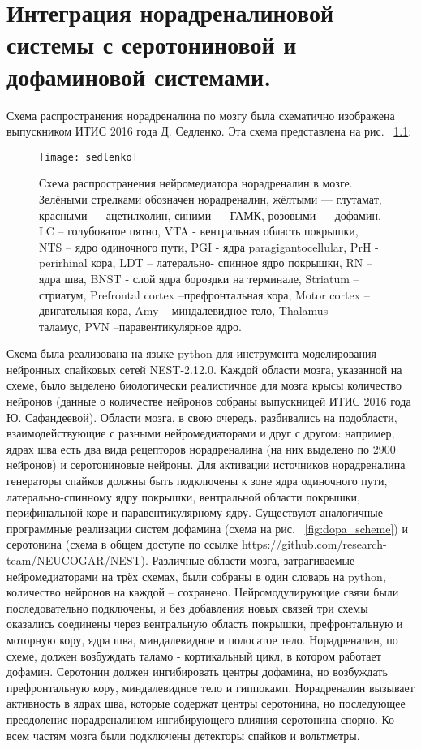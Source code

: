 \chapter{Интеграция норадреналиновой системы с серотониновой и дофаминовой системами.}
\label{chap:implementation}
Схема распространения норадреналина по мозгу была схематично изображена выпускником ИТИС 2016 года Д. Седленко. Эта схема представлена на рис. ~\ref{fig:nora_scheme}:


\begin{figure}
	\centering
	\texttt{[image: sedlenko]}
	\caption{Схема распространения нейромедиатора норадреналин в мозге. Зелёными стрелками обозначен норадреналин, жёлтыми — глутамат, красными — ацетилхолин, синими — ГАМК, розовыми — дофамин. LC – голубоватое пятно, VTA - вентральная область покрышки, NTS – ядро одиночного пути, PGI - ядра paragigantocellular, PrH - perirhinal кора, LDT – латерально- спинное ядро покрышки, RN – ядра шва, BNST - слой ядра бороздки на терминале, Striatum – стриатум, Prefrontal cortex –префронтальная кора, Motor cortex –двигательная кора, Amy – миндалевидное тело, Thalamus – таламус, PVN –паравентикулярное ядро.}
	\label{fig:nora_scheme}
\end{figure}

Схема была реализована на языке python для инструмента моделирования нейронных спайковых сетей NEST-2.12.0. Каждой области мозга, указанной на схеме, было выделено биологически реалистичное для мозга крысы количество нейронов (данные о количестве нейронов собраны выпускницей ИТИС 2016 года Ю. Сафандеевой). Области мозга, в свою очередь, разбивались на подобласти, взаимодействующие с разными нейромедиаторами и друг с другом: например, ядрах шва есть два вида рецепторов норадреналина (на них выделено по 2900 нейронов) и серотониновые нейроны. Для активации источников норадреналина генераторы спайков должны быть подключены к зоне ядра одиночного пути, латерально-спинному ядру покрышки, вентральной области покрышки, перифинальной коре и паравентикулярному ядру.
Существуют аналогичные программные реализации систем дофамина (схема на рис. ~\ref{fig:dopa_scheme}) и серотонина (схема в общем доступе по ссылке https://github.com/research-team/NEUCOGAR/NEST). Различные области мозга, затрагиваемые нейромедиаторами на трёх схемах, были собраны в один словарь на python, количество нейронов на каждой – сохранено. Нейромодулирующие связи были последовательно подключены, и без добавления новых связей три схемы оказались соединены через вентральную область покрышки, префронтальную и моторную кору, ядра шва, миндалевидное и полосатое тело. Норадреналин, по схеме, должен возбуждать таламо - кортикальный цикл, в котором работает дофамин. Серотонин должен ингибировать центры дофамина, но возбуждать префронтальную кору, миндалевидное тело и гиппокамп. Норадреналин вызывает активность в ядрах шва, которые содержат центры серотонина, но последующее преодоление норадреналином ингибирующего влияния серотонина спорно. Ко всем частям мозга были подключены детекторы спайков и вольтметры.


